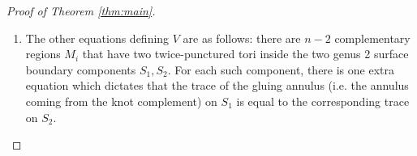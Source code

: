 \documentclass{article}
\theoremstyle{plain}
\theoremstyle{definition}
\theoremstyle{plain}
\theoremstyle{plain}
\theoremstyle{plain}
\theoremstyle{remark}
\theoremstyle{remark}
\theoremstyle{plain}
\theoremstyle{plain}
\begin{document}
\begin{proof}[Proof of Theorem \ref{thm:main}]
\begin{enumerate}
		\begin{equation}
			x_1 = x_1' \ \ \ \ \ x_2 = x_2' \ \ \ \ \ x_3 = x_3' \ \ \ \ \ x_{12} = x_{12}' \ \ \ \ \ x_{13} = x_{13}'
		\end{equation} 
		On each twice-punctured torus, since the punctures correspond to the same loop $[\beta]$ in $M$, the two punctures are known to be have equal trace. We thus have the trace equation
		\begin{equation}
			\text{tr}(bc^{-1}) = \text{tr}(aba^{-1}c^{-1})
		\end{equation} 
		which translates into the equations
		\begin{equation}
			x_2x_3 - x_3 = x_{12}x_{13} - x_1x_{123} + x_{23} \ \ \ \ \ x_2'x_3' - x_3' = x_{12}'x_{13}' - x_1'x_{123}' + x_{23}'
		\end{equation}
		Hence we can use our existing six equations to conclude that $x_{23} = x_{23}'$. By Section 5.1 in \cite{Goldman}, $(x_{123}, x_{132})$ and $(x_{123}', x_{132}')$ are pairs of solutions to quadratics with coefficients in the other six coordinates, which we already know are equal. Thus, either $(x_{123}, x_{132}) = (x_{132}', x_{123}')$ or $(x_{123}, x_{132}) = (x_{123}', x_{132}')$; each option represents one component of the variety $V$. Pick the component with $(x_{123}, x_{132}) = (x_{123}', x_{132}')$; we now have an irreducible component defined with $5(n - 1)$ equations (5 equations for $n - 1$ gluings). 
		\item The other equations defining $V$ are as follows: there are $n - 2$ complementary regions $M_i$ that have two twice-punctured tori inside the two genus 2 surface boundary components $S_1, S_2$. For each such component, there is one extra equation which dictates that the trace of the gluing annulus (i.e. the annulus coming from the knot complement) on $S_1$ is equal to the corresponding trace on $S_2$.
	\end{enumerate}

\end{proof}
\end{document}
